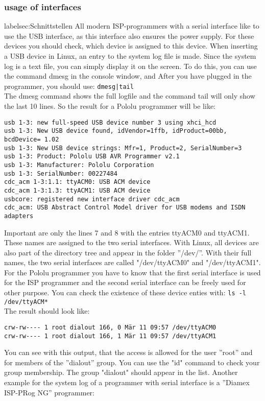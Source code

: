 \subsubsection{usage of interfaces}
label{sec:Schnittstellen}
All modern ISP-programmers with a serial interface like to use the USB interface,
as this interface also ensures the power supply. 
For these devices you should check, which device is assigned to this device.
When inserting a USB device in Linux, an entry to the system log file is made.
Since the system log is a text file, you can simply display it on the screen.
To do this, you can use the command dmesg in the console window, and
After you have plugged in the programmer, you should use:
\verb"dmesg|tail"\\
The dmesg command shows the full logfile and the command tail will only show the
last 10 lines. So the result for a Pololu programmer will be like:
\begin{footnotesize}
\begin{verbatim}
usb 1-3: new full-speed USB device number 3 using xhci_hcd
usb 1-3: New USB device found, idVendor=1ffb, idProduct=00bb, bcdDevice= 1.02
usb 1-3: New USB device strings: Mfr=1, Product=2, SerialNumber=3
usb 1-3: Product: Pololu USB AVR Programmer v2.1
usb 1-3: Manufacturer: Pololu Corporation
usb 1-3: SerialNumber: 00227484
cdc_acm 1-3:1.1: ttyACM0: USB ACM device
cdc_acm 1-3:1.3: ttyACM1: USB ACM device
usbcore: registered new interface driver cdc_acm
cdc_acm: USB Abstract Control Model driver for USB modems and ISDN adapters
\end{verbatim}
\end{footnotesize}
Important are only the lines 7 and 8 with the entries ttyACM0 and ttyACM1.
These names are assigned to the two serial interfaces.
With Linux, all devices are also part of the directory tree and appear in the
folder ''/dev/''.
With their full names, the two serial interfaces are called "/dev/ttyACM0" and "/dev/ttyACM1".
For the Pololu programmer you have to know that the first serial interface is used for
the ISP programmer and the second serial interface can be freely used for other purpose.
You can check the existence of these device enties with:
\verb"ls -l /dev/ttyACM*"\\
The result should look like:
\begin{footnotesize}
\begin{verbatim}
crw-rw---- 1 root dialout 166, 0 Mär 11 09:57 /dev/ttyACM0
crw-rw---- 1 root dialout 166, 1 Mär 11 09:57 /dev/ttyACM1
\end{verbatim}
\end{footnotesize}
You can see with this output, that the access is allowed for the user ''root''
and for members of the ''dialout'' group.
You can use the "id" command to check your group membership.
The group "dialout" should appear in the list.
Another example for the system log of a programmer with serial interface
is a ''Diamex ISP-PRog NG'' programmer:

